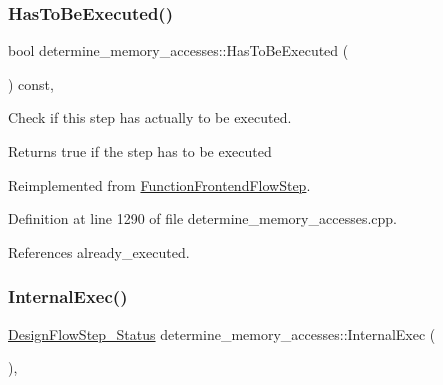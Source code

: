 \mbox{\label{classdetermine__memory__accesses_a5a273a8e5ec33a4abc8989169231c827}} 
\subsubsection{\texorpdfstring{Has\+To\+Be\+Executed()}{HasToBeExecuted()}}
{\footnotesize\ttfamily bool determine\+\_\+memory\+\_\+accesses\+::\+Has\+To\+Be\+Executed (\begin{DoxyParamCaption}{ }\end{DoxyParamCaption}) const\hspace{0.3cm}{\ttfamily [override]}, {\ttfamily [virtual]}}



Check if this step has actually to be executed. 

\begin{DoxyReturn}{Returns}
true if the step has to be executed 
\end{DoxyReturn}


Reimplemented from \hyperlink{classFunctionFrontendFlowStep_a12e786363530aa9533e4bd9380130d75}{Function\+Frontend\+Flow\+Step}.



Definition at line 1290 of file determine\+\_\+memory\+\_\+accesses.\+cpp.



References already\+\_\+executed.

\mbox{\label{classdetermine__memory__accesses_a28439693ec5dde524cb6ae92d6d8ce28}} 
\subsubsection{\texorpdfstring{Internal\+Exec()}{InternalExec()}}
{\footnotesize\ttfamily \hyperlink{design__flow__step_8hpp_afb1f0d73069c26076b8d31dbc8ebecdf}{Design\+Flow\+Step\+\_\+\+Status} determine\+\_\+memory\+\_\+accesses\+::\+Internal\+Exec (\begin{DoxyParamCaption}{ }\end{DoxyParamCaption})\hspace{0.3cm}{\ttfamily [override]}, {\ttfamily [virtual]}}



